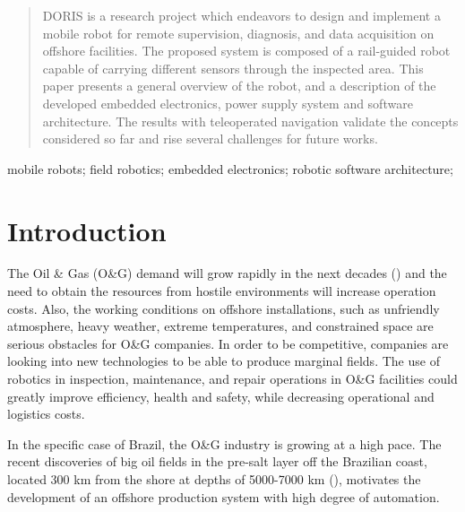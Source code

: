 \documentclass{ifacconf}
\begin{document}
\begin{frontmatter}
\begin{abstract}                %
DORIS is a research project which endeavors to design and implement a mobile
robot for remote supervision, diagnosis, and data acquisition on offshore
facilities. The proposed system is composed of a rail-guided robot capable of
carrying different sensors through the inspected area. This paper presents a
general overview of the robot, and a description of the developed embedded
electronics, power supply system and software architecture. The results
with teleoperated navigation validate the concepts considered so far and
rise several challenges for future works.
\end{abstract}

\begin{keyword}
mobile robots; field robotics; embedded electronics; robotic
software architecture;
\end{keyword}

\end{frontmatter}

\section{Introduction}
The Oil \& Gas (O\&G) demand will grow rapidly in the next decades (\cite{wna})
and the need to obtain the resources from hostile environments will increase
operation costs. Also, the working conditions on offshore installations, such
as unfriendly atmosphere, heavy weather, extreme temperatures, and constrained
space are serious obstacles for O\&G
companies. In order to be competitive, companies are looking into new
technologies to be able to produce marginal fields. The
use of robotics in inspection, maintenance, and repair operations in O\&G
facilities could greatly improve efficiency, health and safety, while
decreasing operational and logistics costs.

In the specific case of Brazil, the O\&G industry is growing at a high
pace. The recent discoveries of big oil fields in the pre-salt layer off the
Brazilian coast, located 300 km from the shore at depths of 5000-7000 km
(\cite{presal}), motivates the development of an offshore  production system
with high degree of automation.

\end{document}
